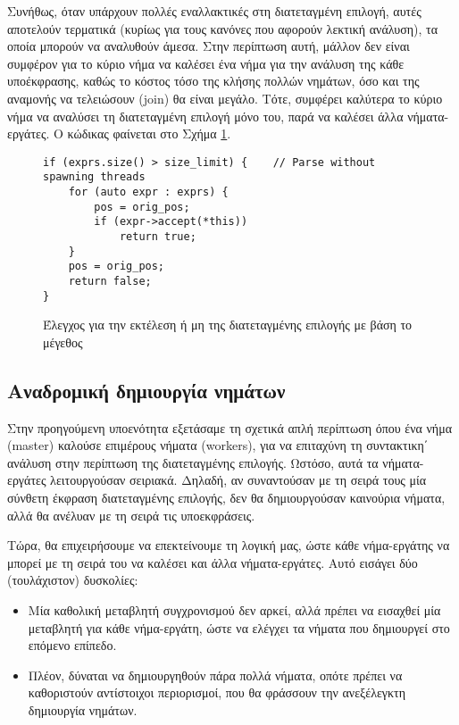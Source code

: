 
Συνήθως, όταν υπάρχουν πολλές εναλλακτικές στη διατεταγμένη επιλογή, αυτές αποτελούν τερματικά (κυρίως για τους κανόνες που αφορούν λεκτική ανάλυση), τα οποία μπορούν να αναλυθούν άμεσα. 
Στην περίπτωση αυτή, μάλλον δεν είναι συμφέρον για το κύριο νήμα να καλέσει ένα νήμα για την ανάλυση της κάθε υποέκφρασης, καθώς το κόστος τόσο της κλήσης πολλών νημάτων, όσο και της αναμονής να τελειώσουν (join) θα είναι μεγάλο.
Τότε, συμφέρει καλύτερα το κύριο νήμα να αναλύσει τη διατεταγμένη επιλογή μόνο του, παρά να καλέσει άλλα νήματα-εργάτες. 
Ο κώδικας φαίνεται στο Σχήμα \ref{fig:expr_size}.

\begin{figure}[h]
\setlength\partopsep{-\topsep}%
\begin{verbatim}
if (exprs.size() > size_limit) {    // Parse without spawning threads
    for (auto expr : exprs) {
        pos = orig_pos;
        if (expr->accept(*this))
            return true;
    }
    pos = orig_pos;
    return false;
}
\end{verbatim}
\caption{Έλεγχος για την εκτέλεση ή μη της διατεταγμένης επιλογής με βάση το μέγεθος}
\label{fig:expr_size}
\end{figure}

\subsection{Αναδρομική δημιουργία νημάτων}

Στην προηγούμενη υποενότητα εξετάσαμε τη σχετικά απλή περίπτωση όπου ένα νήμα (master) καλούσε επιμέρους νήματα (workers), για να επιταχύνη τη συντακτικη΄ ανάλυση στην περίπτωση της διατεταγμένης επιλογής.
Ωστόσο, αυτά τα νήματα-εργάτες λειτουργούσαν σειριακά.
Δηλαδή, αν συναντούσαν με τη σειρά τους μία σύνθετη έκφραση διατεταγμένης επιλογής, δεν θα δημιουργούσαν καινούρια νήματα, αλλά θα ανέλυαν με τη σειρά τις υποεκφράσεις.

Τώρα, θα επιχειρήσουμε να επεκτείνουμε τη λογική μας, ώστε κάθε νήμα-εργάτης να μπορεί με τη σειρά του να καλέσει και άλλα νήματα-εργάτες.
Αυτό εισάγει δύο (τουλάχιστον) δυσκολίες:

\begin{itemize}
	\item Μία καθολική μεταβλητή συγχρονισμού δεν αρκεί, αλλά πρέπει να εισαχθεί μία μεταβλητή για κάθε νήμα-εργάτη, ώστε να ελέγχει τα νήματα που δημιουργεί στο επόμενο επίπεδο.
	\item Πλέον, δύναται να δημιουργηθούν πάρα πολλά νήματα, οπότε πρέπει να καθοριστούν αντίστοιχοι περιορισμοί, που θα φράσσουν την ανεξέλεγκτη δημιουργία νημάτων.
\end{itemize}

